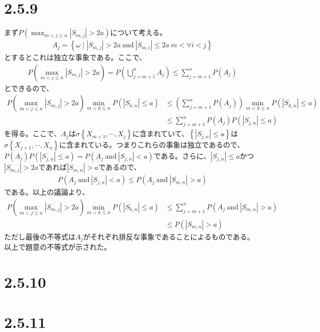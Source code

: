 \documentclass{article}
\begin{document}
\section{2.5.9}
まず$P\left( \max_{m<j\leq n} \left|S_{m,j}\right| > 2a \right)$について考える。
\begin{align*}
	A_j = \left\{ \omega\mid \left| S_{m,j} \right| > 2a\ \text{and}\ \left| S_{m,i} \right| \leq 2a\ m < \forall i < j \right\}
\end{align*}
とするとこれは独立な事象である。ここで、
\begin{align*}
	P\left( \max_{m<j\leq n} \left|S_{m,j}\right| > 2a \right) = P\left( \bigcup_{j=m+1}^n A_j \right) \leq \sum_{j=m+1}^n P\left( A_j \right)
\end{align*}
とできるので、
\begin{align*}
	P\left( \max_{m<j\leq n} \left|S_{m,j}\right| > 2a \right) \min_{m<k \leq n}P\left( \left| S_{k, n} \right| \leq a \right) &\leq \left(\sum_{j=m+1}^n P\left( A_j \right) \right)  \min_{m<k \leq n}P\left( \left| S_{k, n} \right| \leq a \right)\\[10pt]
	&\leq \sum_{j=m+1}^n P\left( A_j \right) P\left( \left| S_{j,n} \right| \leq a \right)
\end{align*}
を得る。ここで、$A_j$は$\sigma\left\{ X_{m+1}, \cdots, X_j \right\}$に含まれていて、$\left\{ \left| S_{j,n} \right| \leq a \right\}$は$\sigma\left\{ X_{j+1}, \cdots, X_n \right\}$に含まれている。つまりこれらの事象は独立であるので、$P\left( A_j \right) P\left( \left| S_{j,n} \right| \leq a \right) = P\left( A_j \ \text{and}\ \left| S_{j,n} \right| < a \right)$である。さらに、$\left| S_{j,n} \right| \leq a$かつ$ \left| S_{m,j} \right| > 2a$であれば$ \left| S_{m,n} \right| > a$であるので、
\begin{align*}
	P\left( A_j \ \text{and}\ \left| S_{j,n} \right| < a \right) \leq P\left( A_j \ \text{and}\ \left| S_{m,n} \right| > a \right)
\end{align*}
である。以上の議論より、
\begin{align*}
	P\left( \max_{m<j\leq n} \left|S_{m,j}\right| > 2a \right) \min_{m<k \leq n}P\left( \left| S_{k, n} \right| \leq a \right) &\leq \sum_{j=m+1}^n P\left( A_j \ \text{and}\ \left| S_{m,n} \right| > a \right)\\[10pt]
	&\leq P\left( \left| S_{m,n} \right| > a \right)
\end{align*}
ただし最後の不等式は$A_j$がそれぞれ排反な事象であることによるものである。以上で題意の不等式が示された。

\section{2.5.10}

\section{2.5.11}
\end{document}
